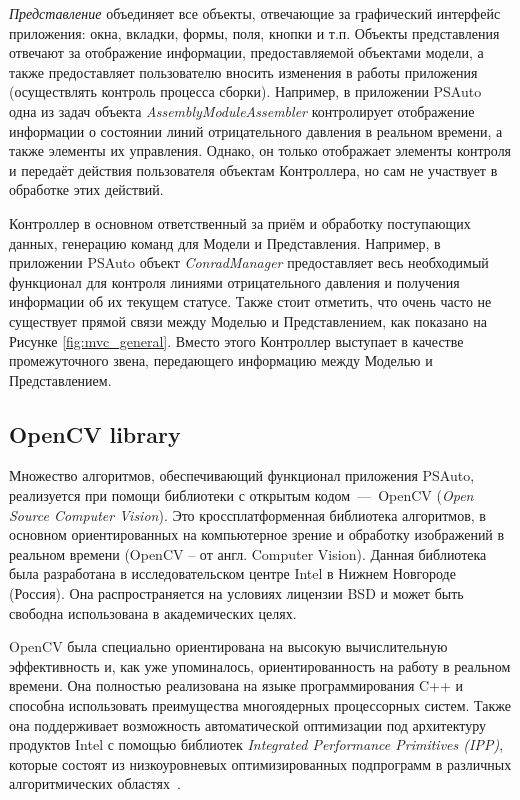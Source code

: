 \emph{Представление} объединяет все объекты, отвечающие за графический интерфейс приложения: окна, вкладки, формы, поля, кнопки и т.п. Объекты представления отвечают за отображение информации, предоставляемой объектами модели, а также предоставляет пользователю вносить изменения в работы приложения (осуществлять контроль процесса сборки). Например, в приложении PSAuto одна из задач объекта \emph{AssemblyModuleAssembler} контролирует отображение информации о состоянии линий отрицательного давления в реальном времени, а также элементы их управления. Однако, он только отображает элементы контроля и передаёт действия пользователя объектам Контроллера, но сам не участвует в обработке этих действий.

Контроллер в основном ответственный за приём и обработку поступающих данных, генерацию команд для Модели и Представления. Например, в приложении PSAuto объект \emph{ConradManager} предоставляет весь необходимый функционал для контроля линиями отрицательного давления и получения информации об их текущем статусе. Также стоит отметить, что очень часто не существует прямой связи между Моделью и Представлением, как показано на Рисунке \ref{fig:mvc_general}. Вместо этого Контроллер выступает в качестве промежуточного звена, передающего информацию между Моделью и Представлением.

\subsection{OpenCV library}

Множество алгоритмов, обеспечивающий функционал приложения PSAuto, реализуется при помощи библиотеки с открытым кодом~---~OpenCV (\textit{Open Source Computer Vision}). Это кроссплатформенная библиотека алгоритмов, в основном ориентированных на компьютерное зрение и обработку изображений в реальном времени (OpenCV -- от англ. Computer Vision). Данная библиотека была разработана в исследовательском центре Intel в Нижнем Новгороде (Россия). Она распространяется на условиях лицензии BSD и может быть свободна использована в академических целях.

OpenCV была специально ориентирована на высокую вычислительную эффективность и, как уже упоминалось, ориентированность на работу в реальном времени. Она полностью реализована на языке программирования C++ и способна использовать преимущества многоядерных процессорных систем. Также она поддерживает возможность автоматической оптимизации под архитектуру продуктов Intel с помощью библиотек \textit{Integrated Performance Primitives (IPP)}, которые состоят из низкоуровневых оптимизированных подпрограмм в различных алгоритмических областях~\cite{kaehler2016learning}.

